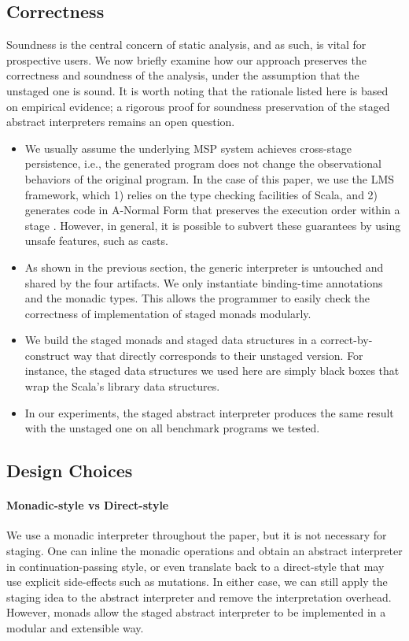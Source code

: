 \subsection{Correctness}

Soundness is the central concern of static analysis, and as such, is vital
for prospective users. We now briefly examine how our
approach preserves the correctness and soundness of the analysis, under the
assumption that the unstaged one is sound. It is worth noting that the rationale
listed here is based on empirical evidence; a rigorous proof for soundness
preservation of the staged abstract interpreters remains an open question.

\begin{itemize}
  \item We usually assume the underlying MSP system achieves cross-stage
    persistence, i.e., the generated program does not change the observational
    behaviors of the original program. In the case of this paper, we use the
    LMS framework, which 1) relies on the type checking facilities of Scala, and
    2) generates code in A-Normal Form \cite{Flanagan:1993:ECC:155090.155113}
    that preserves the execution order within a stage \cite{DBLP:conf/birthday/Rompf16}.
    However, in general, it is possible to subvert these guarantees by
    using unsafe features, such as casts.
  \item As shown in the previous section, the generic interpreter is untouched
    and shared by the four artifacts. We only instantiate binding-time
    annotations and the monadic types. This allows the programmer to easily
    check the correctness of implementation of staged monads modularly.
  \item We build the staged monads and staged data structures in a
    correct-by-construct way that directly corresponds to their unstaged
    version. For instance, the staged data structures we used here are simply
    black boxes that wrap the Scala's library data structures.
  \item In our experiments, the staged abstract interpreter produces the same
    result with the unstaged one on all benchmark programs we tested.
\end{itemize}

\subsection{Design Choices}

\paragraph{Monadic-style vs Direct-style} We use a monadic interpreter throughout the paper,
but it is not necessary for staging. One can inline the monadic
operations and obtain an abstract interpreter in continuation-passing
style, or even translate back to a direct-style that may use explicit
side-effects such as mutations. In either case, we can still apply the
staging idea to the abstract interpreter and remove the interpretation
overhead. However, monads allow the staged abstract interpreter to be
implemented in a modular and extensible way.

